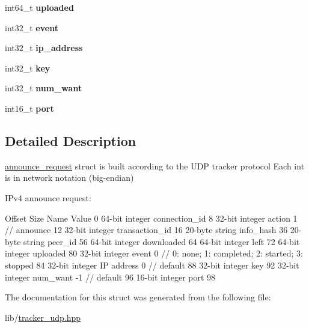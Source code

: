 \begin{DoxyCompactItemize}
\mbox{\label{structt__udp_1_1announce__request_a721e8aa39b84774e00b09a49f3ae49f1}} 
int64\+\_\+t {\bfseries uploaded}
\item 
\mbox{\label{structt__udp_1_1announce__request_aede8d35b95c9665c31ec87db2151c1d0}} 
int32\+\_\+t {\bfseries event}
\item 
\mbox{\label{structt__udp_1_1announce__request_a4de2f6e241950ef3e80f021e3db981c0}} 
int32\+\_\+t {\bfseries ip\+\_\+address}
\item 
\mbox{\label{structt__udp_1_1announce__request_a4303273fb6add36551bc11dce8217c49}} 
int32\+\_\+t {\bfseries key}
\item 
\mbox{\label{structt__udp_1_1announce__request_ad206bd9fee8496a1232c00d9415d6887}} 
int32\+\_\+t {\bfseries num\+\_\+want}
\item 
\mbox{\label{structt__udp_1_1announce__request_a7aecf590db2a1358b3a623521c94db71}} 
int16\+\_\+t {\bfseries port}
\end{DoxyCompactItemize}


\subsection{Detailed Description}
\hyperlink{structt__udp_1_1announce__request}{announce\+\_\+request} struct is built according to the U\+DP tracker protocol Each int is in network notation (big-\/endian)

I\+Pv4 announce request\+: \begin{DoxyVerb} Offset  Size    Name    Value
 0       64-bit integer  connection_id
 8       32-bit integer  action          1 // announce
 12      32-bit integer  transaction_id
 16      20-byte string  info_hash
 36      20-byte string  peer_id
 56      64-bit integer  downloaded
 64      64-bit integer  left
 72      64-bit integer  uploaded
 80      32-bit integer  event           0 // 0: none; 1: completed; 2: started; 3: stopped
 84      32-bit integer  IP address      0 // default
 88      32-bit integer  key
 92      32-bit integer  num_want        -1 // default
 96      16-bit integer  port
 98\end{DoxyVerb}
 

The documentation for this struct was generated from the following file\+:\begin{DoxyCompactItemize}
\item 
lib/\hyperlink{tracker__udp_8hpp}{tracker\+\_\+udp.\+hpp}\end{DoxyCompactItemize}
